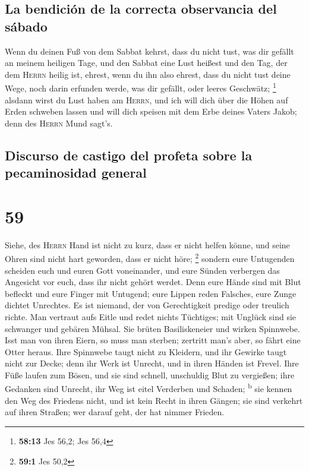 \hypertarget{la-bendiciuxf3n-de-la-correcta-observancia-del-suxe1bado}{%
\subsection{La bendición de la correcta observancia del
sábado}\label{la-bendiciuxf3n-de-la-correcta-observancia-del-suxe1bado}}

 Wenn du deinen Fuß von dem Sabbat kehrst, dass du nicht
tust, was dir gefällt an meinem heiligen Tage, und den Sabbat eine Lust
heißest und den Tag, der dem \textsc{Herrn} heilig ist, ehrest, wenn du
ihn also ehrest, dass du nicht tust deine Wege, noch darin erfunden
werde, was dir gefällt, oder leeres Geschwätz; \footnote{\textbf{58:13}
  Jes 56,2; Jes 56,4}  alsdann wirst du Lust haben am
\textsc{Herrn}, und ich will dich über die Höhen auf Erden schweben
lassen und will dich speisen mit dem Erbe deines Vaters Jakob; denn des
\textsc{Herrn} Mund sagt's.

\hypertarget{discurso-de-castigo-del-profeta-sobre-la-pecaminosidad-general}{%
\subsection{Discurso de castigo del profeta sobre la pecaminosidad
general}\label{discurso-de-castigo-del-profeta-sobre-la-pecaminosidad-general}}

\hypertarget{section-58}{%
\section{59}\label{section-58}}

 Siehe, des \textsc{Herrn} Hand ist nicht zu kurz, dass er
nicht helfen könne, und seine Ohren sind nicht hart geworden, dass er
nicht höre; \footnote{\textbf{59:1} Jes 50,2}  sondern
eure Untugenden scheiden euch und euren Gott voneinander, und eure
Sünden verbergen das Angesicht vor euch, dass ihr nicht gehört werdet.
 Denn eure Hände sind mit Blut befleckt und eure Finger
mit Untugend; eure Lippen reden Falsches, eure Zunge dichtet Unrechtes.
 Es ist niemand, der von Gerechtigkeit predige oder
treulich richte. Man vertraut aufs Eitle und redet nichts Tüchtiges; mit
Unglück sind sie schwanger und gebären Mühsal.  Sie brüten
Basiliskeneier und wirken Spinnwebe. Isst man von ihren Eiern, so muss
man sterben; zertritt man's aber, so fährt eine Otter heraus.
 Ihre Spinnwebe taugt nicht zu Kleidern, und ihr Gewirke
taugt nicht zur Decke; denn ihr Werk ist Unrecht, und in ihren Händen
ist Frevel.  Ihre Füße laufen zum Bösen, und sie sind
schnell, unschuldig Blut zu vergießen; ihre Gedanken sind Unrecht, ihr
Weg ist eitel Verderben und Schaden; \textsuperscript{b} 
sie kennen den Weg des Friedens nicht, und ist kein Recht in ihren
Gängen; sie sind verkehrt auf ihren Straßen; wer darauf geht, der hat
nimmer Frieden.


